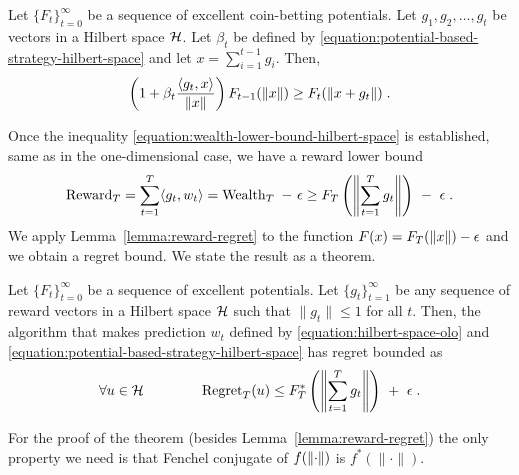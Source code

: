 \begin{lemma}
\label{lemma:recursion_hilbert}
Let $\{F_t\}_{t=0}^\infty$ be a sequence of excellent coin-betting potentials.
Let $g_1, g_2, \dots, g_t$ be vectors in a Hilbert space $\mathcal{H}$. Let $\beta_t$
be defined by \eqref{equation:potential-based-strategy-hilbert-space}
and let $x = \sum_{i=1}^{t-1} g_i$. Then,
$$
\left(1 + \beta_t \frac{\langle g_t, x \rangle}{\|x\|} \right) F_{t-1}(\left\|{x}\right\|)
\ge F_t(\left\|{x + g_t}\right\|) \; .
$$
\end{lemma}

Once the inequality \eqref{equation:wealth-lower-bound-hilbert-space} is
established, same as in the one-dimensional case, we have a reward lower bound
\begin{equation}
\label{equation:hilbert-space-olo-reward-lower-bound}
\operatorname{Reward}_T
= \sum_{t=1}^T \langle g_t, w_t \rangle
= \operatorname{Wealth}_T \ - \ \epsilon
\ge F_T\left(\left\|{\sum_{t=1}^T g_t}\right\| \right) \ - \ \epsilon \; .
\end{equation}
We apply Lemma~\ref{lemma:reward-regret} to the function $F(x) = F_T(\left\|{x}\right\|) -
\epsilon$ and we obtain a regret bound. We state the result as a theorem.

\begin{theorem}
\label{theorem:hilbert-space-olo-regret-bound}
Let $\{F_t\}_{t=0}^\infty$ be a sequence of excellent potentials. Let
$\{g_t\}_{t=1}^\infty$ be any sequence of reward vectors in a Hilbert space $\mathcal{H}$
such that $\|g_t\| \le 1$ for all $t$. Then, the algorithm that makes prediction
$w_t$ defined by \eqref{equation:hilbert-space-olo} and
\eqref{equation:potential-based-strategy-hilbert-space} has regret bounded as
$$
\forall u \in \H \qquad \qquad
\Regret_T(u) \le F_T^*\left(\norm{\sum_{t=1}^T g_t} \right) \ + \ \epsilon \; .
$$
\end{theorem}

For the proof of the theorem (besides Lemma~\ref{lemma:reward-regret})
the only property we need is that Fenchel conjugate of $f(\left\|{\cdot}\right\|)$
is $f^*(\|\cdot\|)$.
